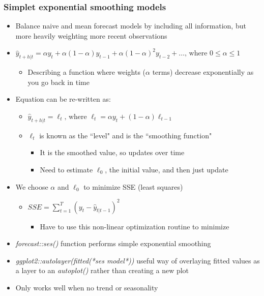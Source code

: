 \documentclass{article}\usepackage[]{graphicx}\usepackage[]{color}
\begin{document}
\subsubsection{Simplet exponential smoothing models}
\begin{itemize}
    \item Balance naive and mean forecast models by including all information, but more heavily weighting more recent observations
    \item $\hat{y}_{t+h|t} = \alpha y_t + \alpha(1-\alpha) y_{t-1} + \alpha(1-\alpha)^2 y_{t-2} + \ldots \text{, where } 0 \le \alpha \le 1$
    \begin{itemize}
        \item Describing a function where weights ($\alpha$ terms) decrease exponentially as you go back in time
    \end{itemize}
    \item Equation can be re-written as:
        \begin{itemize}
            \item $\hat{y}_{t+h|t} = \ell_t \text{, where } \ell_t = \alpha y_t + (1 - \alpha)\ell_{t-1}$
            \item $\ell_t$ is known as the ``level" and is the ``smoothing function"
            \begin{itemize}
                \item It is the smoothed value, so updates over time
                \item Need to estimate $\ell_0$, the initial value, and then just update
            \end{itemize}
        \end{itemize}
    \item We choose $\alpha$ and $\ell_0$ to minimize SSE (least squares)
    \begin{itemize}
        \item $SSE = \sum_{t=1}^T \left(y_t - \hat{y}_{t|t-1}\right)^2$
        \begin{itemize}
            \item Have to use this non-linear optimization routine to minimize
        \end{itemize}
    \end{itemize}
    \item \textit{forecast::ses()} function performs simple exponential smoothing
    \item \textit{ggplot2::autolayer(fitted(*ses model*))} useful way of overlaying fitted values as a layer to an \textit{autoplot()} rather than creating a new plot
    \item Only works well when no trend or seasonality
\end{itemize}
\end{document}
